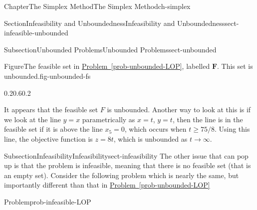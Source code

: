 \documentclass[oneside,10pt,]{book}
\newcommand{\xreffont}{\relax}
\numberwithin{equation}{section}
\begin{document}
\begin{chapterptx}{Chapter}{The Simplex Method}{}{The Simplex Method}{}{}{ch-simplex}
\begin{sectionptx}{Section}{Infeasibility and Unboundedness}{}{Infeasibility and Unboundedness}{}{}{sect-infeasible-unbounded}
\begin{subsectionptx}{Subsection}{Unbounded Problems}{}{Unbounded Problems}{}{}{sect-unbounded}
\begin{figureptx}{Figure}{The feasible set in \hyperref[prob-unbounded-LOP]{Problem~{\xreffont\ref{prob-unbounded-LOP}}}, labelled \(\boldsymbol{F}\). This set is unbounded.}{fig-unbounded-fs}{}
\begin{image}{0.2}{0.6}{0.2}{}%
%
\end{image}%
\tcblower
\end{figureptx}%
It appears that the feasible set \(F\) is unbounded. Another way to look at this is if we look at the line \(y=x\) parametrically as \(x=t\), \(y=t\), then the line is in the feasible set if it is above the line \(x_5=0\), which occurs when \(t \geq 75/8\). Using this line, the objective function is \(z = 8t\), which is unbounded as \(t \to \infty\).%
\end{subsectionptx}
%
%
\typeout{************************************************}
\typeout{************************************************}
%
\begin{subsectionptx}{Subsection}{Infeasibility}{}{Infeasibility}{}{}{sect-infeasibility}
The other issue that can pop up is that the problem is infeasible, meaning  that there is no feasible set (that is an empty set). Consider the following problem which is nearly the same, but importantly different than that in \hyperref[prob-unbounded-LOP]{Problem~{\xreffont\ref{prob-unbounded-LOP}}}%
\begin{problem}{Problem}{}{prob-infeasible-LOP}%

\end{problem}
\end{subsectionptx}
\end{sectionptx}
\end{chapterptx}
\end{document}
